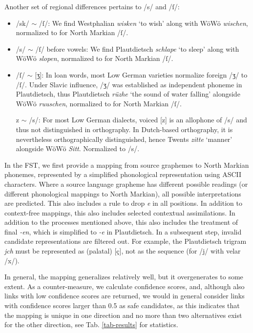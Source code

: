 \documentclass{article}
\newcommand{\word}[1]{\textsl{#1}}
\begin{document}
Another set of regional differences pertains to /s/ and /ſ/:

\begin{itemize}
    \item /sk/ $\sim$ /ſ/: We find Westphalian \word{wisken} `to wish' along with WöWö \word{wischen}, normalized to  for North Markian /ſ/.
    \item /s/ $\sim$ /ſ/ before vowels: We find Plautdietsch \word{schlape} `to sleep' along with WöWö \word{slopen}, normalized to  for North Markian /ſ/.
    \item /ſ/ $\sim$ [ʒ]: In loan words, most Low German varieties normalize foreign /ʒ/ to /ſ/. Under Slavic influence, /ʒ/ was established as independent phoneme in Plautdietsch, thus Plautdietsch \word{rüzhe} `the sound of water falling' alongside WöWö \word{ruuschen}, normalized to  for North Markian /ſ/.
    \item [z] $\sim$ /s/: For most Low German dialects, voiced [z] is an allophone of /s/ and thus not distinguished in orthography. In Dutch-based orthography, it is nevertheless orthographically distinguished, hence Twents \word{zitte} `manner' alongside WöWö \word{Sitt}. Normalized to /s/.
\end{itemize}

In the FST, we first provide a mapping from source graphemes to North Markian phonemes, represented by a simplified phonological representation using ASCII characters. Where a source language grapheme has different possible readings (or different phonological mappings to North Markian), all possible interpretations are predicted. This also includes a rule to drop \word{e} in all positions. In addition to context-free mappings, this also includes selected contextual assimilations. In addition to the processes mentioned above, this also includes the treatment of final \word{-en}, which is simplified to \word{-e} in Plautdietsch. In a subsequent step, invalid candidate representations are filtered out. For example, the Plautdietsch trigram \word{jch} must be represented as (palatal)  [ç], not as the sequence  (for /j/ with velar /x/).

In general, the mapping generalizes relatively well, but it overgenerates to some extent. As a counter-measure, we calculate confidence scores, and, although also links with low confidence scores are returned, we would in general consider links with confidence scores larger than 0.5 as safe candidates, as this indicates that the mapping is unique in one direction and no more than two alternatives exist for the other direction, see Tab. \ref{tab-results} for statistics.
\end{document}
